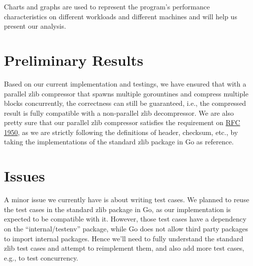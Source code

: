 \documentclass{article}
\begin{document}
\noindent Charts and graphs are used to represent the program's performance characteristics on different workloads and different machines and will help us present our analysis.

\section{Preliminary Results}
Based on our current implementation and testings, we have ensured that with a parallel zlib compressor that spawns multiple gorountines and compress multiple blocks concurrently, the correctness can still be guaranteed, i.e., the compressed result is fully compatible with a non-parallel zlib decompressor. We are also pretty sure that our parallel zlib compressor satisfies the requirement on \href{https://tools.ietf.org/html/rfc1950}{RFC 1950}, as we are strictly following the definitions of header,  checksum, etc., by taking the implementations of the standard zlib package in Go as reference.

\section{Issues}
A minor issue we currently have is about writing test cases. We planned to reuse the test cases in the standard zlib package in Go, as our implementation is expected to be compatible with it. However, those test cases have a dependency on the ``internal/testenv'' package, while Go does not allow third party packages to import internal packages. Hence we'll need to fully understand the standard zlib test cases and attempt to reimplement them, and also add more test cases, e.g., to test concurrency.
\end{document}
